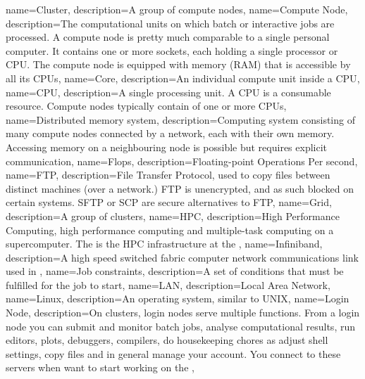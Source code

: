 {
  name={Cluster},
  description={A group of compute nodes},
}
{
  name={Compute Node},
  description={The computational units on which batch or interactive jobs are processed. A compute node is pretty much comparable to a single personal computer. It contains one or more sockets, each holding a single processor or CPU. The compute node is equipped with memory (RAM) that is accessible by all its CPUs},
}
{
  name={Core},
  description={An individual compute unit inside a CPU},
}
{
  name={CPU},
  description={A single processing unit. A CPU is a consumable resource. Compute nodes typically contain of one or more CPUs},
}
{
  name={Distributed memory system},
  description={Computing system consisting of many compute nodes connected by a network, each with their own memory. Accessing memory on a neighbouring node is possible but requires explicit communication},
}
{
  name={Flops},
  description={Floating-point Operations Per second},
}
{
  name={FTP},
  description={File Transfer Protocol, used to copy files between distinct machines (over a network.) FTP is unencrypted, and as such blocked on certain systems. SFTP or SCP are secure alternatives to FTP},
}
{
  name={Grid},
  description={A group of clusters},
}
{
  name={HPC},
  description={High Performance Computing, high performance computing and multiple-task computing on a supercomputer. The \hpcInfra is the HPC infrastructure at the \university},
}
{
  name={Infiniband},
  description={A high speed switched fabric computer network communications link used in \hpc},
}
{
  name={Job constraints},
  description={A set of conditions that must be fulfilled for the job to start},
}
{
  name={LAN},
  description={Local Area Network},
}
{
  name={Linux},
  description={An operating system, similar to UNIX},
}
{
  name={Login Node},
  description={On \hpc clusters, login nodes serve multiple functions. From a login node you can submit and monitor batch jobs, analyse computational results, run editors, plots, debuggers, compilers, do housekeeping chores as adjust shell settings, copy files and in general manage your account. You connect to these servers when want to start working on the \hpcInfra},
}

